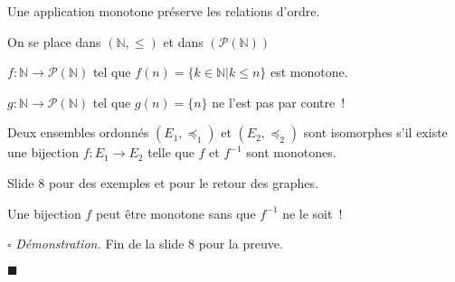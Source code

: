 \documentclass[a4paper, titlepage]{article}
\renewenvironment{proof}{\par$\square$ \footnotesize\textit{Démonstration.}}{\begin{flushright}$\blacksquare$\end{flushright}\par}
\begin{document}
    Une application monotone préserve les relations d'ordre.
    \begin{exemple}
        On se place dans $(\mathbb{N},\leqslant)$ et dans $(\mathcal{P}(\mathbb{N}))$

        $f:\mathbb{N}\to \mathcal{P}(\mathbb{N})$ tel que $f(n) = \{k\in\mathbb{N}|k\leqslant n\}$ est monotone.

        $g:\mathbb{N}\to \mathcal{P}(\mathbb{N})$ tel que $g(n)=\{n\}$ ne l'est pas par contre~!
    \end{exemple}
    \begin{props}
        Deux ensembles ordonnés $(E_1,\preceq_1)$ et $(E_2,\preceq_2)$ sont isomorphes s'il existe une bijection
        $f:E_1\to E_2$ telle que $f$ et $f^{-1}$ sont monotones.
    \end{props}
    Slide 8 pour des exemples et pour le retour des graphes.
    \begin{warn}
        Une bijection $f$ peut être monotone sans que $f^{-1}$ ne le soit~!
    \end{warn}
    \begin{proof}
        Fin de la slide 8 pour la preuve.
    \end{proof}
\end{document}
